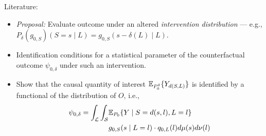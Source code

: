 \documentclass{beamer}
\begin{document}
\begin{frame}[c]{Literature: \cite{diaz2012population, diaz2018stochastic}}

\begin{center}
\begin{itemize}
  \itemsep8pt
  \item \textit{Proposal:} Evaluate outcome under an altered
    \textit{intervention distribution} --- e.g.,
    $P_{\delta}(g_{0,S})(S = s \mid L) = g_{0,S}(s - \delta(L) \mid L)$.
  \item Identification conditions for a statistical parameter of the
    counterfactual outcome $\psi_{0,\delta}$ under such an intervention.
  \item Show that the causal quantity of interest $\mathbb{E}_{P_0^{\delta}}
    \{Y_{d(S, L)}\}$ is identified by a functional of the distribution of $O$,
    i.e.,
    \begin{align*}\label{eqn:identification2012}
      \psi_{0,\delta} = \int_{\mathcal{L}} \int_{\mathcal{S}} &\mathbb{E}_{P_0}
        \{Y \mid S = d(s, l), L = l\} \\ &g_{0, S}(s \mid L = l) \cdot
        q_{0, L}(l) d\mu(s)d\nu(l)
    \end{align*}
\end{itemize}
\end{center}


\end{frame}

\end{document}
